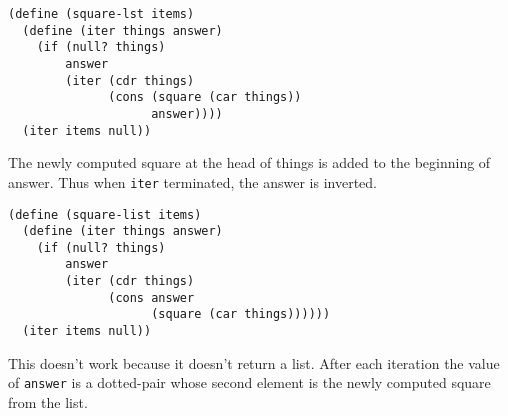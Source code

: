 \documentclass[a4paper,12pt]{article}
\begin{document}
\begin{lstlisting}
(define (square-lst items)
  (define (iter things answer)
    (if (null? things)
        answer
        (iter (cdr things)
              (cons (square (car things))
                    answer))))
  (iter items null))
\end{lstlisting}
The newly computed square at the head of things is added to the
beginning of answer.  Thus when \lstinline!iter! terminated, the
answer is inverted.

\begin{lstlisting}
(define (square-list items)
  (define (iter things answer)
    (if (null? things)
        answer
        (iter (cdr things)
              (cons answer
                    (square (car things))))))
  (iter items null))
\end{lstlisting}
This doesn't work because it doesn't return a list.  After each
iteration the value of \lstinline!answer! is a dotted-pair whose
second element is the newly computed square from the list.
\end{document}
